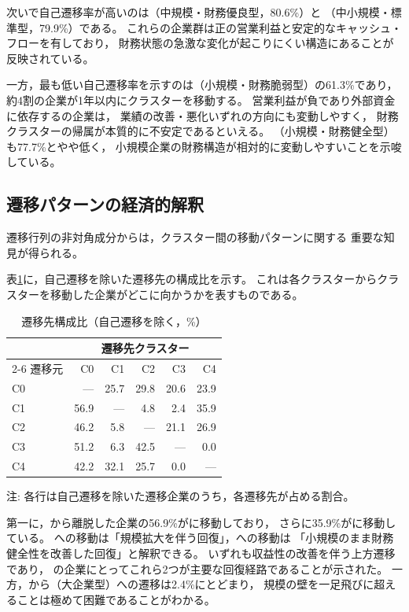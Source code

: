 次いで自己遷移率が高いのは（中規模・財務優良型，80.6\%）と
（中小規模・標準型，79.9\%）である。
これらの企業群は正の営業利益と安定的なキャッシュ・フローを有しており，
財務状態の急激な変化が起こりにくい構造にあることが反映されている。

一方，最も低い自己遷移率を示すのは（小規模・財務脆弱型）の61.3\%であり，
約4割の企業が1年以内にクラスターを移動する。
営業利益が負であり外部資金に依存するの企業は，
業績の改善・悪化いずれの方向にも変動しやすく，
財務クラスターの帰属が本質的に不安定であるといえる。
（小規模・財務健全型）も77.7\%とやや低く，
小規模企業の財務構造が相対的に変動しやすいことを示唆している。

\subsection{遷移パターンの経済的解釈}

遷移行列の非対角成分からは，クラスター間の移動パターンに関する
重要な知見が得られる。

表\ref{tab:transition-destination}に，自己遷移を除いた遷移先の構成比を示す。
これは各クラスターからクラスターを移動した企業がどこに向かうかを表すものである。

\begin{table}[htbp]
  \centering
  \caption{遷移先構成比（自己遷移を除く，\%）}
  \label{tab:transition-destination}
  \begin{tabular}{lrrrrr}
    \toprule
    & \multicolumn{5}{c}{遷移先クラスター} \\
    \cmidrule(lr){2-6}
    遷移元 & C0 & C1 & C2 & C3 & C4 \\
    \midrule
    C0 & --- & 25.7 & 29.8 & 20.6 & 23.9 \\
    C1 & 56.9 & --- & 4.8 & 2.4 & 35.9 \\
    C2 & 46.2 & 5.8 & --- & 21.1 & 26.9 \\
    C3 & 51.2 & 6.3 & 42.5 & --- & 0.0 \\
    C4 & 42.2 & 32.1 & 25.7 & 0.0 & --- \\
    \bottomrule
  \end{tabular}
  \begin{tablenotes}
    \small
    \item 注: 各行は自己遷移を除いた遷移企業のうち，各遷移先が占める割合。
  \end{tablenotes}
\end{table}

第一に，から離脱した企業の56.9\%がに移動しており，
さらに35.9\%がに移動している。
への移動は「規模拡大を伴う回復」，への移動は
「小規模のまま財務健全性を改善した回復」と解釈できる。
いずれも収益性の改善を伴う上方遷移であり，
の企業にとってこれら2つが主要な回復経路であることが示された。
一方，から（大企業型）への遷移は2.4\%にとどまり，
規模の壁を一足飛びに超えることは極めて困難であることがわかる。

